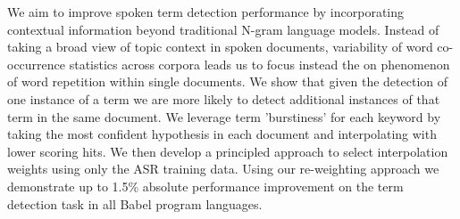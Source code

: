 We aim to improve spoken term detection performance by incorporating contextual information beyond traditional N-gram language models.              Instead of taking a broad view of topic context in spoken documents, variability of word co-occurrence statistics across corpora leads us to focus instead the on phenomenon of word repetition within single documents.              We show that given the detection of one instance of a term we are more likely to detect additional instances of that term in the same document. We leverage term 'burstiness' for each keyword by taking the most confident hypothesis in each document and interpolating with lower scoring hits.              We then develop a principled approach to select interpolation weights using only the ASR training data.  Using our re-weighting approach we demonstrate up to 1.5\% absolute performance improvement on the term detection task in all Babel program languages.
